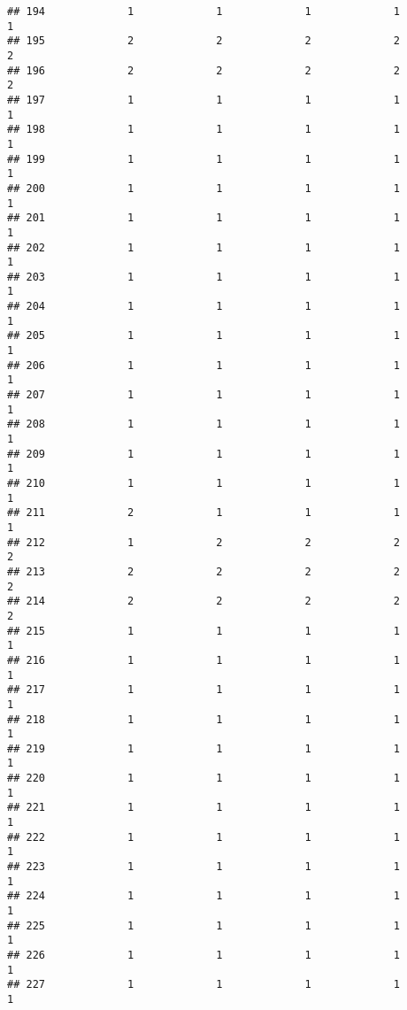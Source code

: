 \documentclass[
]{article}
\begin{document}
\begin{verbatim}
## 194             1             1             1             1             1
## 195             2             2             2             2             2
## 196             2             2             2             2             2
## 197             1             1             1             1             1
## 198             1             1             1             1             1
## 199             1             1             1             1             1
## 200             1             1             1             1             1
## 201             1             1             1             1             1
## 202             1             1             1             1             1
## 203             1             1             1             1             1
## 204             1             1             1             1             1
## 205             1             1             1             1             1
## 206             1             1             1             1             1
## 207             1             1             1             1             1
## 208             1             1             1             1             1
## 209             1             1             1             1             1
## 210             1             1             1             1             1
## 211             2             1             1             1             1
## 212             1             2             2             2             2
## 213             2             2             2             2             2
## 214             2             2             2             2             2
## 215             1             1             1             1             1
## 216             1             1             1             1             1
## 217             1             1             1             1             1
## 218             1             1             1             1             1
## 219             1             1             1             1             1
## 220             1             1             1             1             1
## 221             1             1             1             1             1
## 222             1             1             1             1             1
## 223             1             1             1             1             1
## 224             1             1             1             1             1
## 225             1             1             1             1             1
## 226             1             1             1             1             1
## 227             1             1             1             1             1

\end{verbatim}
\end{document}
